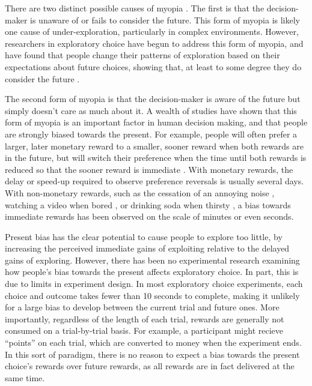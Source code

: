 \documentclass[10pt,letterpaper]{article}
\begin{document}
There are two distinct possible causes of myopia \citep{Bartels2015}. The first is that the decision-maker is
unaware of or fails to consider the future. This form of myopia is likely one
cause of under-exploration, particularly in complex environments. However,
researchers in exploratory choice have begun to address this form of myopia, and
have found that people change their
patterns of exploration based on their expectations about future choices,
showing that, at least to some degree they do consider the future \citep{Meyer1995, Wilson2014a, Rich2017}.

The second form of myopia is that the decision-maker
is aware of the future but simply doesn't care as much about it.
A wealth of studies have shown that this form of myopia is an important factor
in human decision making, and that people are strongly
biased towards  the present. For example, people will often prefer a larger, later monetary
reward to a smaller, sooner reward when both rewards are in the future, but will
switch their preference when the time until both rewards is reduced so that the
sooner reward is immediate \citep{Kirby1995}. With monetary rewards, the delay
or speed-up required to observe preference reversals is usually several days. With non-monetary rewards,
such as the cessation of an annoying noise \citep{Solnick1980}, watching a video
when bored \citep{Navarick1998}, or drinking soda
when thirsty \citep{Brown2009}, a bias towards immediate rewards has been observed on the scale of
minutes or even seconds.

Present bias has the clear potential to cause people to explore too little, by
increasing the perceived immediate gains of exploiting relative to the delayed
gains of exploring. However, there has been no experimental research
examining how people's bias towards the present affects exploratory choice. In
part, this is due to limits in experiment design. In most exploratory
choice experiments, each choice and outcome takes fewer than 10 seconds to
complete, making it unlikely for a large bias to develop between the current
trial and future ones. More importantly, regardless of the length of each trial,
rewards are generally not consumed on a trial-by-trial basis. For example, a participant
might recieve ``points'' on each trial, which are converted to money when the
experiment ends. In this sort of paradigm, there is no reason to expect a bias
towards the present choice's rewards over future rewards, as all rewards are
in fact delivered at the same time.
\end{document}
